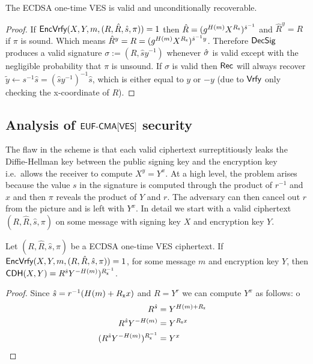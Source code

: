 \begin{lemma}
The ECDSA one-time VES is valid and unconditionally recoverable.
\end{lemma}
\begin{proof}
If $\textsf{EncVrfy}(X,Y,m,(R, \hat{R},\hat{s}, \pi)) = 1$ then $\hat{R} = (g^{H(m)}X^{R_{\mathtt{x}}})^{\hat{s}^{-1}}$ and $\hat{R}^{y} = R$ if $\pi$ is sound. Which means $\hat{R}^{y} = R = (g^{H(m)}X^{R_{\mathtt{x}}})^{\hat{s}^{-1}y}$. Therefore $\textsf{DecSig}$ produces a valid signature $\sigma := (R, \hat{s}y^{-1})$ whenever $\hat{\sigma}$ is valid except with the negligible probability that $\pi$ is unsound. If $\sigma$ is valid then $\textsf{Rec}$ will always recover $\tilde{y} \gets s^{-1}\hat{s} = (\hat{s}y^{-1})^{-1}\hat{s}$, which is either equal to $y$ or $-y$ (due to $\textsf{Vrfy}$ only checking the x-coordinate of $R$).
\end{proof}


\subsection{Analysis of $\textsf{EUF-CMA}[\textsf{VES}]$ security}

The flaw in the scheme is that each valid ciphertext surreptitiously leaks the Diffie-Hellman key between the public signing key and the encryption key i.e.\ allows the receiver to compute $X^y = Y^x$.
At a high level, the problem arises because the value $s$ in the signature is computed through the product of $r^{-1}$ and $x$ and then $\pi$ reveals the product of $Y$ and $r$.
The adversary can then cancel out $r$ from the picture and is left with $Y^x$.
In detail we start with a valid ciphertext $(R, \hat{R},\hat{s}, \pi)$ on some message with signing key $X$ and encryption key $Y$.

\begin{lemma}
  \label{key-leak}
  Let $(R, \hat{R},\hat{s}, \pi)$ be a ECDSA one-time VES ciphertext.
  If $\textsf{EncVrfy}(X,Y,m,(R, \hat{R},\hat{s}, \pi)) = 1$, for some message $m$ and encryption key $Y$, then $\textsf{CDH}(X,Y) = R^{\hat{s}}Y^{-H(m)})^{R_{\mathtt{x}}^{-1}}$.
\end{lemma}
\begin{proof}
  Since $\hat{s} = r^{-1}(H(m) + R_{\mathtt{x}}{}x)$ and $R = Y^r$ we can compute $Y^x$ as follows:
  o\begin{align*}
    R^{\hat{s}} & = Y^{H(m) + R_{\mathtt{x}}} &  \\
    R^{\hat{s}}Y^{-H(m)} & =  Y^{R_{\mathtt{x}}{}x} \\
    (R^{\hat{s}}Y^{-H(m)})^{R_{\mathtt{x}}^{-1}} & = Y^{x}
  \end{align*}
\end{proof}



